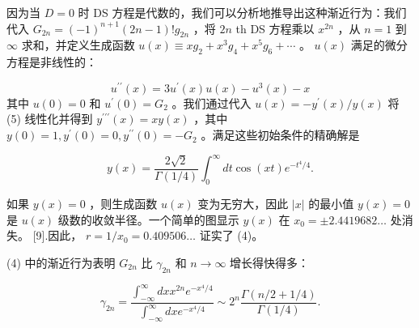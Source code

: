 \documentclass[UTF8]{article}
\begin{document}
因为当  $D=0$  时 DS 方程是代数的，我们可以分析地推导出这种渐近行为：我们代入  $G_{2 n}=(-1)^{n+1}(2 n-1) ! g_{2 n}$ ，将  $2 n$ th DS 方程乘以  $x^{2 n}$ ，从  $n=1$  到  $\infty$  求和，并定义生成函数  $u(x) \equiv x g_2+x^3 g_4+x^5 g_6+\cdots$ 。  $u(x)$  满足的微分方程是非线性的：




 $$u^{\prime \prime}(x)=3 u^{\prime}(x) u(x)-u^3(x)-x
$$  其中  $u(0)=0$  和  $u^{\prime}(0)=G_2$ 。我们通过代入  $u(x)=-y^{\prime}(x) / y(x)$  将 (5) 线性化并得到  $y^{\prime \prime \prime}(x)=x y(x)$ ，其中  $y(0)=1, y^{\prime}(0)=0, y^{\prime \prime}(0)=-G_2$ 。满足这些初始条件的精确解是




 $$y(x)=\frac{2 \sqrt{2}}{\Gamma(1 / 4)} \int_0^{\infty} d t \cos (x t) e^{-t^4 / 4} .
$$ 


如果  $y(x)=0$ ，则生成函数  $u(x)$  变为无穷大，因此  $|x|$  的最小值  $y(x)=0$  是  $u(x)$  级数的收敛半径。一个简单的图显示  $y(x)$  在  $x_0= \pm 2.4419682 \ldots$  处消失。 [9].因此， $r=1 / x_0=0.409506 \ldots$  证实了 (4)。

(4) 中的渐近行为表明  $G_{2 n}$  比  $\gamma_{2 n}$  和  $n \rightarrow \infty$  增长得快得多：


 $$
\gamma_{2 n}=\frac{\int_{-\infty}^{\infty} d x x^{2 n} e^{-x^4 / 4}}{\int_{-\infty}^{\infty} d x e^{-x^4 / 4}} \sim 2^n \frac{\Gamma(n / 2+1 / 4)}{\Gamma(1 / 4)} .
$$ 
\end{document}
